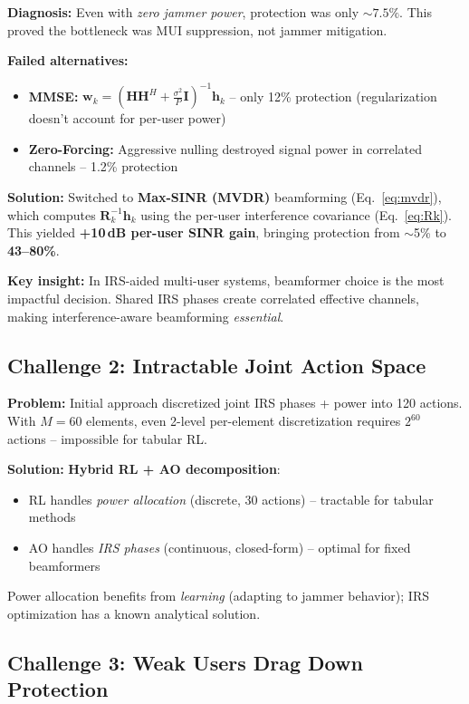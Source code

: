 \documentclass[11pt,a4paper]{article}
\begin{document}
\textbf{Diagnosis:} Even with \emph{zero jammer power}, protection was only $\sim 7.5\%$. This proved the bottleneck was MUI suppression, not jammer mitigation.

\textbf{Failed alternatives:}
\begin{itemize}[nosep]
    \item \textbf{MMSE:} $\mathbf{w}_k = (\mathbf{H}\mathbf{H}^H + \frac{\sigma^2}{P}\mathbf{I})^{-1}\mathbf{h}_k$ -- only 12\% protection (regularization doesn't account for per-user power)
    \item \textbf{Zero-Forcing:} Aggressive nulling destroyed signal power in correlated channels -- 1.2\% protection
\end{itemize}

\textbf{Solution:} Switched to \textbf{Max-SINR (MVDR)} beamforming (Eq.~\ref{eq:mvdr}), which computes $\mathbf{R}_k^{-1}\mathbf{h}_k$ using the per-user interference covariance (Eq.~\ref{eq:Rk}). This yielded \textbf{+10\,dB per-user SINR gain}, bringing protection from $\sim$5\% to \textbf{43--80\%}.

\textbf{Key insight:} In IRS-aided multi-user systems, beamformer choice is the most impactful decision. Shared IRS phases create correlated effective channels, making interference-aware beamforming \emph{essential}.

\subsection{Challenge 2: Intractable Joint Action Space}

\textbf{Problem:} Initial approach discretized joint IRS phases + power into 120 actions. With $M = 60$ elements, even 2-level per-element discretization requires $2^{60}$ actions -- impossible for tabular RL.

\textbf{Solution:} \textbf{Hybrid RL + AO decomposition}:
\begin{itemize}[nosep]
    \item RL handles \emph{power allocation} (discrete, 30 actions) -- tractable for tabular methods
    \item AO handles \emph{IRS phases} (continuous, closed-form) -- optimal for fixed beamformers
\end{itemize}
Power allocation benefits from \emph{learning} (adapting to jammer behavior); IRS optimization has a known analytical solution.

\subsection{Challenge 3: Weak Users Drag Down Protection}
\end{document}
